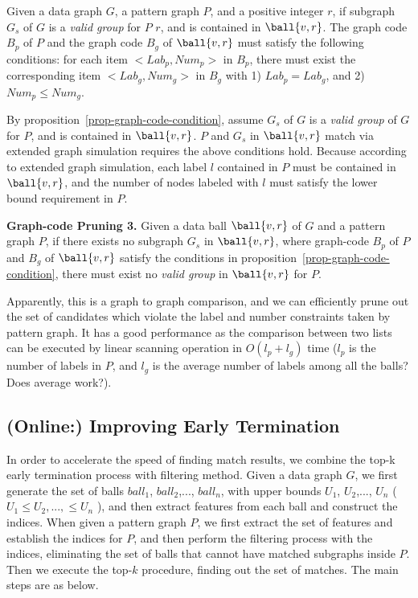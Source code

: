 \begin{prop}
\label{prop-graph-code-condition}
Given a data graph $G$, a pattern graph $P$, and a positive integer $r$, if subgraph $G_{s}$ of $G$ is a {\em valid group} for $P$ \wrt $r$, and is contained in $\ball{v, r}$. The graph code $B_p$ of $P$ and the graph code $B_g$ of $\ball{v, r}$ must satisfy the following conditions:  for each item $<Lab_p,Num_p>$ in $B_p$, there must exist the corresponding item $<Lab_g,Num_g>$ in $B_g$ with 1) $Lab_p=Lab_g$, and 2) $Num_p \leq Num_g$.
\end{prop}

By proposition~\ref{prop-graph-code-condition}, assume $G_{s}$ of $G$ is a {\em valid group} of $G$ for $P$, and is contained in $\ball{v, r}$. $P$ and $G_{s}$ in $\ball{v, r}$ match via extended graph simulation requires the above conditions hold. Because according to extended graph simulation, each label $l$ contained in $P$ must be contained in $\ball{v, r}$, and the number of nodes labeled with $l$ must satisfy the lower bound requirement in $P$.

\begin{theorem} {\textbf{Graph-code Pruning 3.}}
\label{thm-graph-code-pruning}
Given a data ball $\ball{v, r}$ of $G$ and a pattern graph $P$, if there exists no subgraph $G_s$ in $\ball{v, r}$, where graph-code $B_p$ of $P$ and $B_g$ of $\ball{v, r}$ satisfy the conditions in proposition~\ref{prop-graph-code-condition}, there must exist no {\em valid group} in $\ball{v, r}$ for $P$.
\end{theorem}

Apparently, this is a graph to graph comparison, and we can efficiently prune out the set of candidates which violate the label and number constraints taken by pattern graph. It has a good performance as the comparison between two lists can be executed by linear scanning operation in $O(l_p+l_g)$ time ($l_p$ is the number of labels in $P$, and $l_g$ is the average number of labels among all the balls? Does average work?).

\subsection{(Online:) Improving Early Termination}

In order to accelerate the speed of finding match results, we combine the top-k early termination process with filtering method. Given a data graph $G$, we first generate the set of balls $ball_1$, $ball_2$,..., $ball_n$, with upper bounds $U_1$, $U_2$,..., $U_n$ ($U_1 \leq U_2,..., \leq U_n$ ), and then extract features from each ball and construct the indices. When given a pattern graph $P$, we first extract the set of features and establish the indices for $P$, and then perform the filtering process with the indices, eliminating the set of balls that cannot have matched subgraphs inside \wrt $P$. Then we execute the top-$k$ procedure, finding out the set of matches. The main steps are as below.

